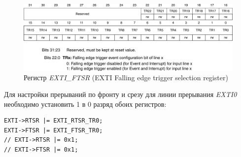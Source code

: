 \begin{figure}[H]
\begin{center}
\includegraphics[scale=0.25]{Image/69.jpg} 
\end{center}
\caption{Регистр \textit{EXTI\_FTSR} (EXTI Falling edge trigger selection register)}
\end{figure}
Для настройки прерываний по фронту и срезу для линии прерывания \textit{EXTI0} необходимо установить 1 в 0 разряд обоих регистров:
\begin{verbatim}
EXTI->RTSR |= EXTI_RTSR_TR0;
EXTI->FTSR |= EXTI_FTSR_TR0;
// EXTI->RTSR |= 0x1; 
// EXTI->FTSR |= 0x1;
\end{verbatim}

